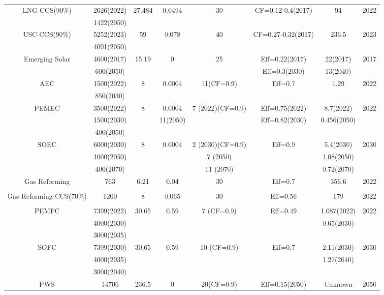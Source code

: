 \begin{landscape}
\begin{longtable}{ |*{8}{c|} }
LNG-CCS(90\%) & 2626(2022) & 27.484 & 0.0494 & 30 & CF=0.12-0.4(2017) & 94 & 2022 \\
 \cite{eia_cost_2020,ipcc_climate_2014} & 1422(2050) &  & &  &  &  & \\
USC-CCS(90\%) & 5252(2023) & 59 & 0.078 & 40 & CF=0.27-0.32(2017) & 236.5 & 2023 \\
 \cite{eia_cost_2020,ipcc_climate_2014} & 4091(2050) &  &  &  &  &  & \\
Emerging Solar & 4600(2017) & 15.19 & 0 & 25 & Eff=0.22(2017) & 22(2017) & 2017 \\
 \cite{irena_solar_2012,peng_review_2013} & 600(2050) &  &  &  &Eff=0.3(2030)  & 13(2040) &  \\
\gls{AEC}  & 1500(2022) & 8 & 0.0004 & 11(CF=0.9) & Eff=0.7 & 1.29 & 2022\\
\cite{iea_technology_2015, bhandari_life_2014, cetinkaya_life_2012, burkhardt_hydrogen_2016} & 850(2030) &  &  &  &  & &  \\
\gls{PEMEC} & 3500(2022) & 8 & 0.0004 & 7 (2022)(CF=0.9) & Eff=0.75(2022) & 8.7(2022) & 2022\\
\cite{iea_technology_2015, bareis_life_2019, carmo_comprehensive_2013,ayers_research_2010,siracusano_influence_2017,schmidt_future_2017,mayyas_manufacturing_2019} & 1500(2030) &  & 11(2050)  &  & Eff=0.82(2030) & 0.456(2050)  &  \\
 & 400(2050) &  &  &  & &  &  \\
\gls{SOEC} & 6000(2030) & 8 & 0.0004 & 2 (2030)(CF=0.9) & Eff=0.9 & 5.4(2030) & 2030\\
\cite{iea_technology_2015,schmidt_future_2017,hafele_life_2016} & 1000(2050) &  &  & 7 (2050) &  & 1.08(2050) & \\
 & 400(2070) &  &  & 11 (2070) &  & 0.72(2070) & \\
Gas Reforming  & 763 & 6.21 & 0.04 & 30  & Eff=0.7 & 356.6 & 2022\\
\cite{iea_technology_2015,mehmeti_life_2018,keipi_economic_2018} & & & & & &  & \\
Gas Reforming-CCS(70\%) & 1200 & 8 & 0.065 & 30 & Eff=0.56 & 179 & 2022\\
\cite{iea_technology_2015,keipi_economic_2018,cormos_ana-maria_economic_2018} &  &  &  &  &  &  & \\
\gls{PEMFC} \cite{iea_technology_2015,simons_life-cycle_2015,kannan_life_2007} & 7399(2022) & 30.65 & 0.59 & 7 (CF=0.9) & Eff=0.49 & 1.087(2022) & 2022\\
 & 4000(2030) &  &  &  &  & 0.65(2030) &  \\
 & 3000(2035) &  &  &  &  &  &  \\
\gls{SOFC} \cite{iea_technology_2015,simons_life-cycle_2015,rillo_life_2017,tu_advances_2004} & 7399(2030) & 30.65 & 0.59 & 10 (CF=0.9) & Eff=0.7 & 2.11(2030) & 2030\\
 & 4000(2035) &  &  &  &  & 1.27(2040) &  \\
 & 3000(2040) &  &  &  &  & &  \\
\gls{PWS} \cite{pinaud_technical_2013} & 14706  & 236.5 & 0 & 20(CF=0.9) & Eff=0.15(2050) & Unknown & 2050
\label{eco}
\end{longtable}
\end{landscape}

